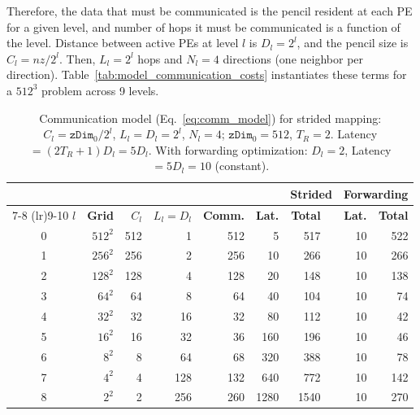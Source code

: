 \documentclass[conference]{IEEEtran}
\begin{document}
            Therefore, %
            the data that must be communicated is the pencil resident at each PE for a given level, and number of hops it must be communicated is a function of the level.  %
            Distance between active PEs at level \(l\) is \(D_l = 2^l\), and the pencil size is \(C_l = nz/2^l\).  Then, \(L_l = 2^l\) hops and \(N_l = 4\) directions (one neighbor per direction). Table~\ref{tab:model_communication_costs} instantiates these terms for a \(512^3\) problem across 9 levels.


            \begin{table}[t]
                \centering
                \caption{Communication model (Eq.~\ref{eq:comm_model}) for strided mapping: $C_l{=}\texttt{zDim}_0/2^l$, $L_l{=}D_l{=}2^l$, $N_l{=}4$; $\texttt{zDim}_0{=}512$, $T_R{=}2$. Latency${=}(2T_R{+}1)D_l{=}5D_l$. With forwarding optimization: $D_l{=}2$, Latency${=}5D_l{=}10$ (constant).}
                \label{tab:comm_model_strided_512}
                \label{tab:model_communication_costs}
                \label{tab:comm_model_constant_dl}
                \renewcommand{\arraystretch}{1.05}
                \setlength{\tabcolsep}{2pt}
                \scriptsize
                \begin{tabular}{@{}cr rrrr rr rr@{}}
                    \toprule
                    & & & & & & \multicolumn{2}{c}{\textbf{Strided}} & \multicolumn{2}{c}{\textbf{Forwarding}} \\
                    \cmidrule(lr){7-8} \cmidrule(lr){9-10}
                    $l$ & \textbf{Grid} & $C_l$ & $L_l{=}D_l$ & \textbf{Comm.} & \textbf{Lat.} & \textbf{Total} & & \textbf{Lat.} & \textbf{Total} \\
                    \midrule
                    0 & $512^2$ & 512 &   1 & 512 &    5 &  517 & &  10 &  522 \\
                    1 & $256^2$ & 256 &   2 & 256 &   10 &  266 & &  10 &  266 \\
                    2 & $128^2$ & 128 &   4 & 128 &   20 &  148 & &  10 &  138 \\
                    3 &  $64^2$ &  64 &   8 &  64 &   40 &  104 & &  10 &   74 \\
                    4 &  $32^2$ &  32 &  16 &  32 &   80 &  112 & &  10 &   42 \\
                    5 &  $16^2$ &  16 &  32 &  36 &  160 &  196 & &  10 &   46 \\
                    6 &   $8^2$ &   8 &  64 &  68 &  320 &  388 & &  10 &   78 \\
                    7 &   $4^2$ &   4 & 128 & 132 &  640 &  772 & &  10 &  142 \\
                    8 &   $2^2$ &   2 & 256 & 260 & 1280 & 1540 & &  10 &  270 \\
                    \bottomrule
                \end{tabular}
            \end{table}
\end{document}
